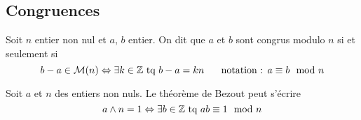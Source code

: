 \begin{propn}
\section{Congruences}
\begin{defi}
  Soit $n$ entier non nul et $a$, $b$ entier. On dit que $a$ et $b$ sont congrus modulo $n$ si et seulement si
\begin{displaymath}
  b-a \in \mathcal{M}(n) \Leftrightarrow \exists k\in\mathbb{Z} \text{ tq } b - a = kn \hspace{0.5cm} \text{ notation : } a \equiv b \mod n
\end{displaymath}
\end{defi}
\begin{rem}
  Soit $a$ et $n$ des entiers non nuls. Le théorème de Bezout peut s'écrire
\begin{displaymath}
  a \wedge n = 1 \Leftrightarrow \exists b \in \mathbb{Z} \text{ tq } ab \equiv 1 \mod n
\end{displaymath}
\end{rem}


\end{propn}
